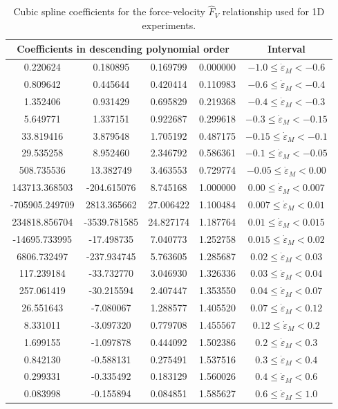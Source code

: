 \documentclass{sfuthesis}
\numberwithin{equation}{section}
\numberwithin{figure}{chapter}
\numberwithin{table}{chapter}
\theoremstyle{definition}
\newcommand{\depsilon}{\dot{\varepsilon}}
\begin{document}
\begin{appendices}
\begin{table}
\centering
\begin{tabular}{|cccc|c|}
\hline
\multicolumn{4}{|c|}{Coefficients in descending polynomial order} & Interval \\\hline
0.220624 & 0.180895 & 0.169799 & 0.000000 & $-1.0 \leq \depsilon_M < -0.6$\\
0.809642 & 0.445644 & 0.420414 & 0.110983 & $-0.6 \leq \depsilon_M < -0.4$\\
1.352406 & 0.931429 & 0.695829 & 0.219368 & $-0.4 \leq \depsilon_M < -0.3$\\
5.649771 & 1.337151 & 0.922687 & 0.299618 & $-0.3 \leq \depsilon_M < -0.15$\\
33.819416 & 3.879548 & 1.705192 & 0.487175 & $-0.15 \leq \depsilon_M < -0.1$\\
29.535258 & 8.952460 & 2.346792 & 0.586361 & $-0.1 \leq \depsilon_M < -0.05$\\
508.735536 & 13.382749 & 3.463553 & 0.729774 & $-0.05 \leq \depsilon_M < 0.00$\\
143713.368503 & -204.615076 & 8.745168 & 1.000000 & $0.00 \leq \depsilon_M < 0.007$\\
-705905.249709 & 2813.365662 & 27.006422 & 1.100484 & $0.007 \leq \depsilon_M < 0.01$\\
234818.856704 & -3539.781585 & 24.827174 & 1.187764 & $0.01 \leq \depsilon_M < 0.015$\\
-14695.733995 & -17.498735 & 7.040773 & 1.252758 & $0.015 \leq \depsilon_M < 0.02$\\
6806.732497 & -237.934745 & 5.763605 & 1.285687 & $0.02 \leq \depsilon_M < 0.03$\\
117.239184 & -33.732770 & 3.046930 & 1.326336 & $0.03 \leq \depsilon_M < 0.04$\\
257.061419 & -30.215594 & 2.407447 & 1.353550 & $0.04 \leq \depsilon_M < 0.07$\\
26.551643 & -7.080067 & 1.288577 & 1.405520 & $0.07 \leq \depsilon_M < 0.12$\\
8.331011 & -3.097320 & 0.779708 & 1.455567 & $0.12 \leq \depsilon_M < 0.2$\\
1.699155 & -1.097878 & 0.444092 & 1.502386 & $0.2 \leq \depsilon_M < 0.3$\\
0.842130 & -0.588131 & 0.275491 & 1.537516 & $0.3 \leq \depsilon_M < 0.4$\\
0.299331 & -0.335492 & 0.183129 & 1.560026 & $0.4 \leq \depsilon_M < 0.6$\\
0.083998 & -0.155894 & 0.084851 & 1.585627 & $0.6 \leq \depsilon_M \leq 1.0$\\
\hline
\end{tabular}
\caption{Cubic spline coefficients for the force-velocity $\widehat{F}_V$ relationship used for 1D experiments.}
\end{table}


\end{appendices}
\end{document}
